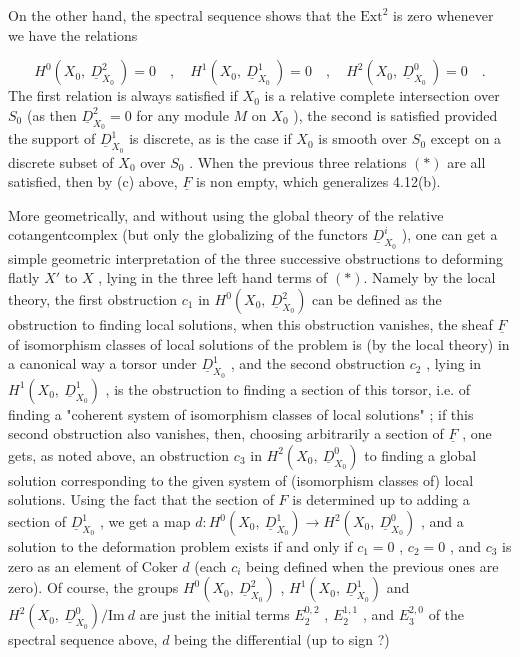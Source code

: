 On the other hand, the spectral sequence shows that the  $\mathrm{Ext}^2$  is zero whenever we have the relations

\begin{equation}\tag{*}
H^0(X_0,\ \underline{D}^2_{X_0}\ ) = 0 \quad ,\quad H^1(X_0,\ \underline{D}^1_{X_0}\ ) = 0 \quad ,\quad H^2(X_0,\ \underline{D}^0_{X_0}\ ) = 0 \quad .
\end{equation}
The first relation is always satisfied if  $X_0$  is a relative complete intersection over  $S_0$  (as then  $\underline{D}^2_{X_0} = 0$  for any module  $M$  on  $X_0$ ), the second is satisfied provided the support of  $\underline{D}^1_{X_0}$  is discrete, as is the case if  $X_0$  is smooth over  $S_0$  except on a discrete subset of  $X_0$  over  $S_0$ . When the previous three relations $(*)$ are all satisfied, then by (c) above,  $\underline{F}$  is non empty, which generalizes 4.12(b).

More geometrically, and without using the global theory of the relative cotangentcomplex (but only the globalizing of the functors  $\underline{D}^i_{X_0}$  ), one can get a simple geometric interpretation of the three successive obstructions to deforming flatly  $X'$  to  $X$ , lying in the three left hand terms of $(*)$. Namely by the local theory, the first obstruction  $c_1$  in  $H^0(X_0,\ \underline{D}^2_{X_0})$  can be defined as the obstruction to finding local solutions, when this obstruction vanishes, the sheaf  $\underline{F}$  of isomorphism classes of local solutions of the problem is (by the local theory) in a canonical way a torsor under  $\underline{D}^1_{X_0}$ , and the second obstruction  $c_2$ , lying in  $H^1(X_0,\ \underline{D}^1_{X_0})$ , is the obstruction to finding a section of this torsor, i.e. of finding a  "coherent system of isomorphism classes of local solutions" ; if this second obstruction also vanishes, then, choosing arbitrarily a section of  $\underline{F}$ , one gets, as noted above, an obstruction  $c_3$  in  $H^2(X_0,\ \underline{D}^0_{X_0})$  to finding a global solution corresponding to the given system of (isomorphism classes of) local solutions. Using the fact that the section of  $F$  is determined up to adding a section of  $\underline{D}^1_{X_0}$ , we get a map  $d : H^0(X_0,\ \underline{D}^1_{X_0}) \to H^2(X_0,\ \underline{D}^0_{X_0})$ , and a solution to the deformation problem exists if and only if  $c_1 = 0$ ,  $c_2 = 0$ , and  $c_3$  is zero as an element of Coker $d$  (each  $c_i$  being defined when the previous ones are zero). Of course, the groups  $H^0(X_0,\ \underline{D}^2_{X_0})$ ,  $H^1(X_0,\ \underline{D}^1_{X_0})$  and
$H^2(X_0,\ \underline{D}^0_{X_0})/\mathrm{Im}\ d$  are just the initial terms  $E_2^{0,2}$ ,  $E_2^{1,1}$ , and  $E_3^{2,0}$  of the spectral sequence above,  $d$  being the differential (up to sign ?)

